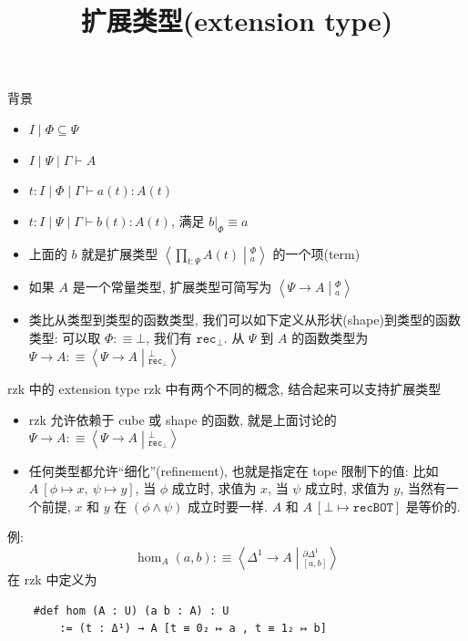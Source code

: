 \documentclass[aspectratio=169,xcolor=dvipsnames]{beamer}
\title{扩展类型(extension type)}
\date{}
\begin{document}
\begin{frame}
    \titlepage
\end{frame}

\begin{frame}{背景}
\begin{itemize}
  \item $I \mid \Phi \subseteq \Psi$
  \item $I \mid \Psi \mid \Gamma \vdash A$
  \item $t : I \mid \Phi \mid \Gamma \vdash a(t) : A(t)$
  \item $t : I \mid \Psi \mid \Gamma \vdash b(t) : A(t)$, 满足 $b|_{\Phi}\equiv a$
  \item 上面的 $b$ 就是扩展类型 $\left\langle \prod_{t:\Psi} A(t) \middle|_{a}^{\Phi}\right\rangle$ 的一个项(term)
  \item 如果 $A$ 是一个常量类型, 扩展类型可简写为 $\left\langle\Psi \to A\middle|_{a}^{\Phi}\right\rangle$
  \item 类比从类型到类型的函数类型, 我们可以如下定义从形状(shape)到类型的函数类型: 可以取 $\Phi:\equiv\bot$, 我们有 $\mathtt{rec}_{\bot}$. 从 $\Psi$ 到 $A$ 的函数类型为 $\Psi \to A:\equiv\left\langle\Psi\to A\middle|_{\mathtt{rec}_{\bot}}^{\bot}\right\rangle$
\end{itemize}
\end{frame}

\begin{frame}{rzk 中的 extension type}
rzk 中有两个不同的概念, 结合起来可以支持扩展类型
\begin{itemize}
  \item rzk 允许依赖于 cube 或 shape 的函数, 就是上面讨论的 $\Psi \to A:\equiv\left\langle\Psi\to A\middle|_{\mathtt{rec}_{\bot}}^{\bot}\right\rangle$
  \item 任何类型都允许“细化”(refinement), 也就是指定在 tope 限制下的值: 比如 $A\ [𝜙 ↦  x,\ 𝜓 ↦  y]$, 当 $𝜙$ 成立时, 求值为 $x$, 当 $𝜓$ 成立时, 求值为 $y$, 当然有一个前提, $x$ 和 $y$ 在 $(𝜙 \land 𝜓)$ 成立时要一样. $A$ 和 $A\ [\bot ↦ \mathtt{recBOT}]$ 是等价的.
\end{itemize}

例:\[\hom_A(a,b) :\equiv \left\langle\Delta^{1} \to A\middle|_{[a,b]}^{\partial\Delta^1}\right\rangle\]
在 rzk 中定义为

\begin{verbatim}
    #def hom (A : U) (a b : A) : U
        := (t : Δ¹) → A [t ≡ 0₂ ↦ a , t ≡ 1₂ ↦ b]
\end{verbatim}

\end{frame}
\end{document}
